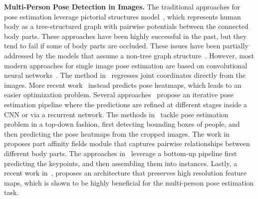 \documentclass{article}
\begin{document}
\textbf{Multi-Person Pose Detection in Images.} The traditional approaches for pose estimation leverage pictorial structures model~\cite{conf/cvpr/AndrilukaRS09,5540156,BMVC.24.12:abbreviated,DBLP:conf/iccv/PishchulinAGS13,YiYang:2011:APE:2191740.2192012}, which represents human body as a tree-structured graph with pairwise potentials between the connected body parts. These approaches have been highly successful in the past, but they tend to fail if some of body parts are occluded. These issues have been partially addressed by the models that assume a non-tree graph structure~\cite{DGLG13,1541292,Sigal:CVPR:2006,10.1007/978-3-540-88690-7_53}. However, most modern approaches for single image pose estimation are based on convolutional neural networks~\cite{DBLP:journals/corr/ToshevS13,he2017maskrcnn,xiao2018simple,cao2017realtime,DBLP:conf/eccv/NewellYD16,DBLP:conf/cvpr/WeiRKS16,sun2019deep,7780881,NIPS2014_5291,6909696,insafutdinov2016deepercut,pishchulin16cvpr,NIPS2014_5573, DBLP:conf/cvpr/PapandreouZKTTB17}. The method in~\cite{DBLP:journals/corr/ToshevS13} regresses  joint coordinates directly from the images. More recent work~\cite{DBLP:conf/eccv/NewellYD16} instead predicts pose heatmaps, which leads to an easier optimization problem. Several approaches~\cite{cao2017realtime,DBLP:conf/cvpr/WeiRKS16,7780881,Belagiannis17} propose an iterative pose estimation pipeline where the predictions are refined at different stages inside a CNN or via a recurrent network. The methods in~\cite{he2017maskrcnn,xiao2018simple,DBLP:conf/cvpr/PapandreouZKTTB17} tackle pose estimation problem in a top-down fashion, first detecting bounding boxes of people, and then predicting the pose heatmaps from the cropped images. The work in~\cite{cao2017realtime} proposes part affinity fields module that captures pairwise relationships between different body parts. The approaches in~\cite{insafutdinov2016deepercut,pishchulin16cvpr} leverage a bottom-up pipeline first predicting the keypoints, and then assembling them into instances. Lastly, a recent work in~\cite{sun2019deep}, proposes an architecture that preserves high resolution feature maps, which is shown to be highly beneficial for the multi-person pose estimation task. 
\end{document}
